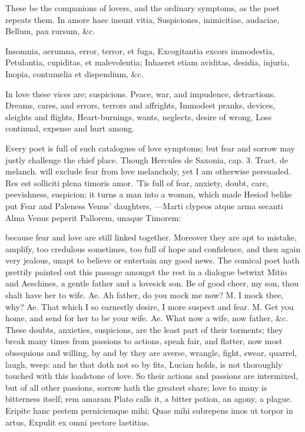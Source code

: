 {These be the companions of lovers, and the ordinary symptoms, as the
poet repeats them.
In amore haec insunt vitia,
Suspiciones, inimicitiae, audaciae,
Bellum, pax rursum, \&c.

Insomnia, aerumna, error, terror, et fuga,
Excogitantia excors immodestia,
Petulantia, cupiditas, et malevolentia;
Inhaeret etiam aviditas, desidia, injuria,
Inopia, contumelia et dispendium, \&c.

In love these vices are; suspicions.
Peace, war, and impudence, detractions.
Dreams, cares, and errors, terrors and affrights,
Immodest pranks, devices, sleights and flights,
Heart-burnings, wants, neglects, desire of wrong,
Loss continual, expense and hurt among.

Every poet is full of such catalogues of love symptoms; but fear and
sorrow may justly challenge the chief place. Though Hercules de
Saxonia, cap. 3. Tract. de melanch. will exclude fear from love
melancholy, yet I am otherwise persuaded. Res est solliciti plena
timoris amor. 'Tis full of fear, anxiety, doubt, care, peevishness,
suspicion; it turns a man into a woman, which made Hesiod belike put
Fear and Paleness Venus' daughters,
---Marti clypeos atque arma secanti
Alma Venus peperit Pallorem, unaque Timorem:

because fear and love are still linked together. Moreover they are apt
to mistake, amplify, too credulous sometimes, too full of hope and
confidence, and then again very jealous, unapt to believe or entertain
any good news. The comical poet hath prettily painted out this passage
amongst the rest in a dialogue betwixt Mitio and Aeschines, a
gentle father and a lovesick son. Be of good cheer, my son, thou shalt
have her to wife. Ae. Ah father, do you mock me now? M. I mock thee,
why? Ae. That which I so earnestly desire, I more suspect and fear. M.
Get you home, and send for her to be your wife. Ae. What now a wife,
now father, \&c. These doubts, anxieties, suspicions, are the least part
of their torments; they break many times from passions to actions,
speak fair, and flatter, now most obsequious and willing, by and by
they are averse, wrangle, fight, swear, quarrel, laugh, weep: and he
that doth not so by fits, Lucian holds, is not thoroughly touched
with this loadstone of love. So their actions and passions are
intermixed, but of all other passions, sorrow hath the greatest share;
love to many is bitterness itself; rem amaram Plato calls it, a
bitter potion, an agony, a plague.
Eripite hanc pestem perniciemque mihi;
Quae mihi subrepens imos ut torpor in artus,
Expulit ex omni pectore laetitias.

}
